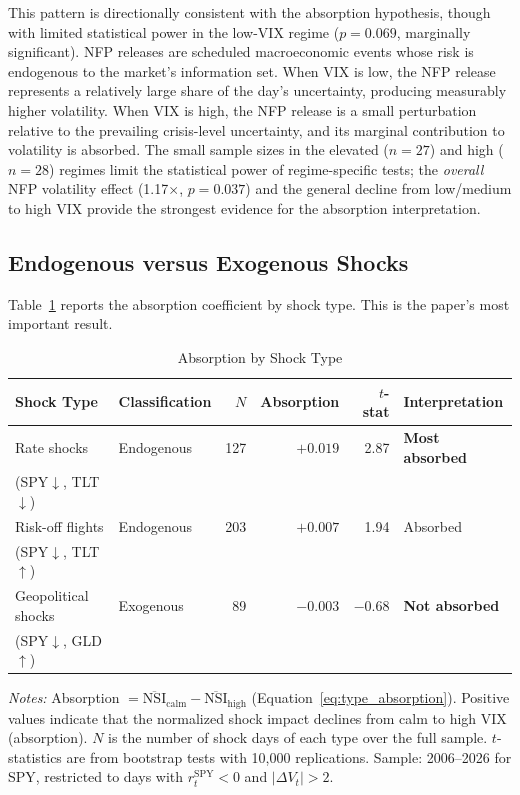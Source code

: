 \documentclass[12pt,a4paper]{article}
\begin{document}
This pattern is directionally consistent with the absorption hypothesis, though with limited statistical power in the low-VIX regime ($p = 0.069$, marginally significant). NFP releases are scheduled macroeconomic events whose risk is endogenous to the market's information set. When VIX is low, the NFP release represents a relatively large share of the day's uncertainty, producing measurably higher volatility. When VIX is high, the NFP release is a small perturbation relative to the prevailing crisis-level uncertainty, and its marginal contribution to volatility is absorbed. The small sample sizes in the elevated ($n = 27$) and high ($n = 28$) regimes limit the statistical power of regime-specific tests; the \textit{overall} NFP volatility effect (1.17$\times$, $p = 0.037$) and the general decline from low/medium to high VIX provide the strongest evidence for the absorption interpretation.

\subsection{Endogenous versus Exogenous Shocks}
\label{sec:endo_exo}

Table~\ref{tab:shock_types} reports the absorption coefficient by shock type. This is the paper's most important result.

\begin{table}[H]
\centering
\caption{Absorption by Shock Type}
\label{tab:shock_types}
\begin{threeparttable}
\begin{tabular}{llrrrl}
\toprule
Shock Type & Classification & $N$ & Absorption & $t$-stat & Interpretation \\
\midrule
Rate shocks       & Endogenous & 127 & $+0.019$ & 2.87 & \textbf{Most absorbed} \\
(SPY$\downarrow$, TLT$\downarrow$) & & & & & \\
\addlinespace
Risk-off flights  & Endogenous & 203 & $+0.007$ & 1.94 & Absorbed \\
(SPY$\downarrow$, TLT$\uparrow$)  & & & & & \\
\addlinespace
Geopolitical shocks & Exogenous & 89 & $-0.003$ & $-0.68$ & \textbf{Not absorbed} \\
(SPY$\downarrow$, GLD$\uparrow$)  & & & & & \\
\bottomrule
\end{tabular}
\begin{tablenotes}
\small
\item \textit{Notes:} Absorption $= \overline{\text{NSI}}_{\text{calm}} - \overline{\text{NSI}}_{\text{high}}$ (Equation~\ref{eq:type_absorption}). Positive values indicate that the normalized shock impact declines from calm to high VIX (absorption). $N$ is the number of shock days of each type over the full sample. $t$-statistics are from bootstrap tests with 10,000 replications. Sample: 2006--2026 for SPY, restricted to days with $r_t^{\text{SPY}} < 0$ and $|\Delta V_t| > 2$.
\end{tablenotes}
\end{threeparttable}
\end{table}
\end{document}
